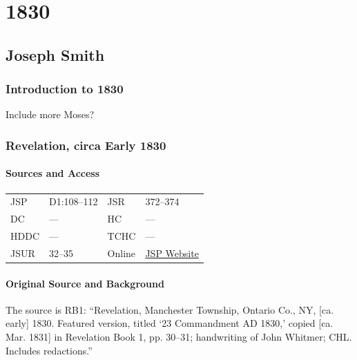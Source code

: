 \section{1830}
	\label{EMS-1830}
	
	\subsection{Joseph Smith}
		\label{EMS-1830-JS}

		\subsubsection{Introduction to 1830}
			\label{EMS-1830-JS-INTRO}
		
			Include more Moses?
			
		\subsubsection{Revelation, circa Early 1830}
			\label{EMS-1830-JS-CIR-EARLY-1830}
		
			\paragraph{Sources and Access}

				\begin{tabular}{p{1in}p{1.5in}p{1in}p{1.5in}}
				JSP	 	& D1:108--112	& JSR & 372--374 \\
				DC	 	& ---		 	& HC 		& --- \\
				HDDC 	& ---			& TCHC 		& --- \\
				JSUR	& 32--35		& Online  & \href{https://www.josephsmithpapers.org/paper-summary/revelation-circa-early-1830/1}{JSP Website} \\
				\end{tabular}
			
			\paragraph{Original Source and Background}
			
				The source is RB1: ``Revelation, Manchester Township, Ontario Co., NY, [ca. early] 1830. Featured version, titled `23 Commandment AD 1830,' copied [ca. Mar. 1831] in Revelation Book 1, pp. 30--31; handwriting of John Whitmer; CHL. Includes redactions.''
				
